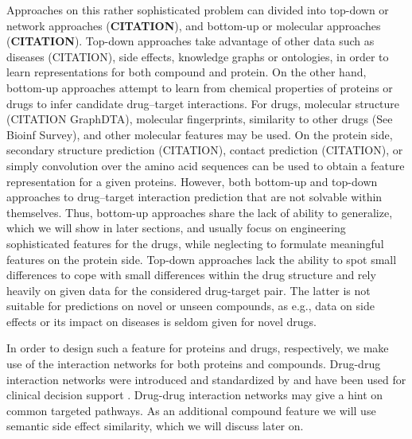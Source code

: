 \documentclass{bioinfo}
\renewcommand{\cite}{\citep}
\begin{document}
Approaches on this rather sophisticated
problem can divided into top-down or network approaches
(\textbf{CITATION}), and bottom-up or molecular approaches
(\textbf{CITATION}). Top-down approaches take advantage of other data
such as diseases (CITATION), side effects, knowledge graphs or
ontologies, in order to learn representations for both compound and
protein.  On the other hand, bottom-up approaches
attempt to learn from chemical properties of proteins or drugs to
infer candidate drug--target interactions. For drugs, molecular
structure (CITATION GraphDTA), molecular fingerprints, similarity to
other drugs (See Bioinf Survey), and other molecular features may be
used. On the protein side, secondary structure prediction (CITATION),
contact prediction (CITATION), or simply
convolution over the amino acid sequences can be used to obtain a
feature representation for a given proteins. However, both bottom-up
and top-down approaches to drug--target interaction prediction
 that are not solvable within
themselves.
Thus, bottom-up approaches share the lack of ability to
generalize, which we will show in later sections, and usually focus on
engineering sophisticated features for the drugs, while neglecting to
formulate meaningful features on the protein side. Top-down approaches
lack the ability to spot small differences to cope with small
differences within the drug structure and rely heavily on given data
for the considered drug-target pair. The latter is not suitable for
predictions on novel or unseen compounds, as e.g., data on side
effects or its impact on diseases is seldom given for novel drugs.

In order to design such a feature for proteins and drugs,
respectively, we make use of the interaction networks for both
proteins and compounds. Drug-drug interaction networks were introduced
and standardized by \citet{Boyce2015} and have been used for clinical
decision support \cite{Scheife2015}. Drug-drug interaction networks
may give a hint on common targeted pathways. As an additional compound
feature we will use semantic side effect similarity, which we will
discuss later on.
\end{document}
